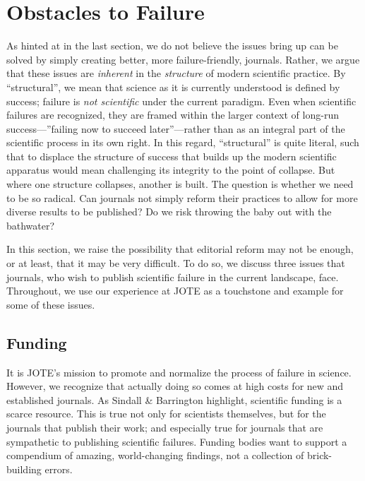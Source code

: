 \documentclass[editorial, authordate,twocolumn,issue]{jote-new-article}
\begin{document}
\section{Obstacles to Failure}

As hinted at in the last section, we do not believe the issues \textcite{Sindall2020} bring up can be solved by simply creating better, more failure-friendly, journals. Rather, we argue that these issues are \emph{inherent }in the \emph{structure} of modern scientific practice. By “structural”, we mean that science as it is currently understood is defined by success; failure is \emph{not scientific} under the current paradigm. Even when scientific failures are recognized, they are framed within the larger context of long-run success—”failing now to succeed later”—rather than as an integral part of the scientific process in its own right. In this regard, “structural” is quite literal, such that to displace the structure of success that builds up the modern scientific apparatus would mean challenging its integrity to the point of collapse. But where one structure collapses, another is built. The question is whether we need to be so radical. Can journals not simply reform their practices to allow for more diverse results to be published? Do we risk throwing the baby out with the bathwater?

In this section, we raise the possibility that editorial reform may not be enough, or at least, that it may be very difficult. To do so, we discuss three issues that journals, who wish to publish scientific failure in the current landscape, face. Throughout, we use our experience at JOTE as a touchstone and example for some of these issues. 


\subsection{Funding}

It is JOTE's mission to promote and normalize the process of failure in science. However, we recognize that actually doing so comes at high costs for new and established journals. As Sindall \& Barrington highlight, scientific funding is a scarce resource. This is true not only for scientists themselves, but for the journals that publish their work; and especially true for journals that are sympathetic to publishing scientific failures. Funding bodies want to support a compendium of amazing, world-changing findings, not a collection of brick-building errors. 
\end{document}
